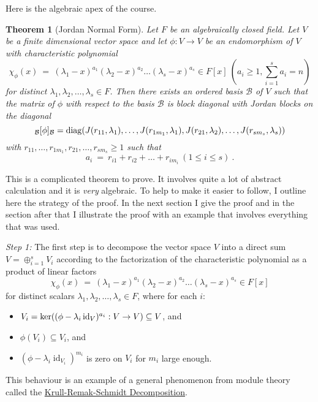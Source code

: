 \documentclass[11pt]{amsbook}
\DeclareMathOperator{\id}{\mathrm{id}}
\newtheorem{theorem}{Theorem}[section]
\theoremstyle{definition}
\begin{document}
Here is the algebraic apex of the course.



\begin{theorem}[Jordan Normal Form]\label{JNFtheorem}
Let $F$ be an algebraically closed field. Let $V$ be a finite dimensional vector space and let $\phi: V\to V$ be an endomorphism of $V$ with characteristic polynomial 
$$\chi_\phi(x)~=~(\lambda_1-x)^{a_1}(\lambda_2-x)^{a_2} \dots 
(\lambda_s-x)^{a_s} \in F[x] ~(a_i \geqslant 1,\sum\limits^s_{i=1}a_i=n)$$
for distinct $\lambda_1,\lambda_2,\dots,\lambda_s \in F$. Then  there exists an ordered basis $\mathcal{B}$ of $V$ such that the matrix of $\phi$ with respect to the basis $\mathcal{B}$ is block diagonal with Jordan blocks on the diagonal $${}_{\mathcal{B}}[\phi]_{\mathcal{B}} = {\rm diag} (J(r_{11}, \lambda_1), \ldots , J(r_{1m_1},\lambda_1),
J(r_{21},\lambda_2),\ldots,  J(r_{s m_s},\lambda_s))$$
with $r_{11},\dots,r_{1m_1},r_{21},\dots,r_{sm_s} \geqslant 1$ such that
$$a_i~=~r_{i1}+r_{i2}+ \dots + r_{im_i}~(1 \leqslant i \leqslant s)~.$$
\end{theorem}
This is a complicated theorem to prove. It involves quite a lot of abstract calculation and it is {\it very} algebraic. To help to make it easier to follow, I outline here the strategy of the proof. In the next section I  give the proof and in the section after that I illustrate the proof with an example that involves everything that was used.
\medskip

{\it Step 1:} The first step is to decompose the vector space $V$ into a direct sum $V = \oplus_{i=1}^s V_i$ according to the factorization of the characteristic polynomial as a product of linear factors
$$\chi_\phi(x)~=~(\lambda_1-x)^{a_1}(\lambda_2-x)^{a_2}\dots 
(\lambda_s-x)^{a_s} \in F[x]$$
for distinct scalars $\lambda_1,\lambda_2,\dots,\lambda_s \in F$,   where for each $i$:
\begin{itemize} 
\item $V_i={\rm ker}((\phi-\lambda_i\id_V)^{a_i}:V \to V)\subseteq V$, and
\item $\phi (V_i) \subseteq V_i$, and
\item $(\phi - \lambda_i\id_{V_i})^{m_i}$ is zero on $V_i$ for $m_i$ large enough.
\end{itemize}
This behaviour is an example of a general phenomenon from module theory called the \href{http://en.wikipedia.org/wiki/Krull-Schmidt_theorem}{Krull-Remak-Schmidt Decomposition}.
\medskip
\end{document}
